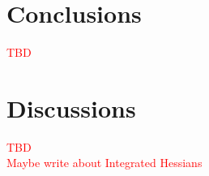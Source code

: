 \documentclass[12pt]{report}
\begin{document}
\chapter{Conclusions} 
\textcolor{red}{TBD}\\
\chapter{Discussions} 


\textcolor{red}{TBD}\\
\textcolor{red}{Maybe write about Integrated Hessians}	 \cite{DBLP:journals/corr/abs-2002-04138}

\newpage

%




	

\printbibliography
\end{document}
